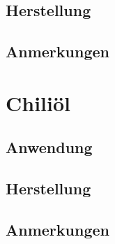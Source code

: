 \subsection{Herstellung}

\subsection{Anmerkungen}




\section{Chiliöl}

\subsection{Anwendung}

\subsection{Herstellung}

\subsection{Anmerkungen}